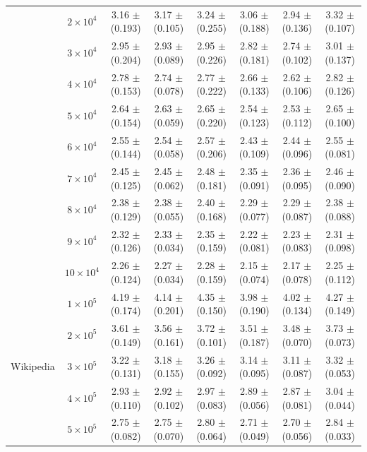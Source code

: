 \documentclass[10pt,journal,compsoc]{IEEEtran}
\newcommand{\Wikipedia}{{\sf Wikipedia}\xspace}
\begin{document}
\begin{table}
\begin{tabular}{c|c|c|c|c|c|c|c}
 & $2 \times 10^4 $ & 3.16 $\pm$ (0.193) & 3.17 $\pm$ (0.105) & 3.24 $\pm$ (0.255) & 3.06 $\pm$ (0.188) & 2.94 $\pm$ (0.136) & 3.32 $\pm$ (0.107)  \\
 & $3 \times 10^4 $ & 2.95 $\pm$ (0.204) & 2.93 $\pm$ (0.089) & 2.95 $\pm$ (0.226) & 2.82 $\pm$ (0.181) & 2.74 $\pm$ (0.102) & 3.01 $\pm$ (0.137)  \\
 & $4 \times 10^4 $ & 2.78 $\pm$ (0.153) & 2.74 $\pm$ (0.078) & 2.77 $\pm$ (0.222) & 2.66 $\pm$ (0.133) & 2.62 $\pm$ (0.106) & 2.82 $\pm$ (0.126) \\
 & $5 \times 10^4 $ & 2.64 $\pm$ (0.154) & 2.63 $\pm$ (0.059) & 2.65 $\pm$ (0.220) & 2.54 $\pm$ (0.123) & 2.53 $\pm$ (0.112) & 2.65 $\pm$ (0.100)  \\
 & $6 \times 10^4 $ & 2.55 $\pm$ (0.144) & 2.54 $\pm$ (0.058) & 2.57 $\pm$ (0.206) & 2.43 $\pm$ (0.109) & 2.44 $\pm$ (0.096) & 2.55 $\pm$ (0.081)  \\
 & $7 \times 10^4 $ & 2.45 $\pm$ (0.125) & 2.45 $\pm$ (0.062) & 2.48 $\pm$ (0.181) & 2.35 $\pm$ (0.091) & 2.36 $\pm$ (0.095) & 2.46 $\pm$ (0.090)  \\
 & $8 \times 10^4 $ & 2.38 $\pm$ (0.129) & 2.38 $\pm$ (0.055) & 2.40 $\pm$ (0.168) & 2.29 $\pm$ (0.077) & 2.29 $\pm$ (0.087) & 2.38 $\pm$ (0.088)  \\
 & $9 \times 10^4 $ & 2.32 $\pm$ (0.126) & 2.33 $\pm$ (0.034) & 2.35 $\pm$ (0.159) & 2.22 $\pm$ (0.081) & 2.23 $\pm$ (0.083) & 2.31 $\pm$ (0.098)  \\
 & $10 \times 10^4 $ & 2.26 $\pm$ (0.124) & 2.27 $\pm$ (0.034) & 2.28 $\pm$ (0.159) & 2.15 $\pm$ (0.074) & 2.17 $\pm$ (0.078) & 2.25 $\pm$ (0.112)  \\
\hline
\multirow{10}{*}{\Wikipedia}
 & $1 \times 10^5 $ & 4.19 $\pm$ (0.174) & 4.14 $\pm$ (0.201) & 4.35 $\pm$ (0.150) & 3.98 $\pm$ (0.190) & 4.02 $\pm$ (0.134) & 4.27 $\pm$ (0.149)  \\
 & $2 \times 10^5 $ & 3.61 $\pm$ (0.149) & 3.56 $\pm$ (0.161) & 3.72 $\pm$ (0.101) & 3.51 $\pm$ (0.187) & 3.48 $\pm$ (0.070) & 3.73 $\pm$ (0.073)  \\
 & $3 \times 10^5 $ & 3.22 $\pm$ (0.131) & 3.18 $\pm$ (0.155) & 3.26 $\pm$ (0.092) & 3.14 $\pm$ (0.095) & 3.11 $\pm$ (0.087) & 3.32 $\pm$ (0.053)  \\
 & $4 \times 10^5 $ & 2.93 $\pm$ (0.110) & 2.92 $\pm$ (0.102) & 2.97 $\pm$ (0.083) & 2.89 $\pm$ (0.056) & 2.87 $\pm$ (0.081) & 3.04 $\pm$ (0.044) \\
 & $5 \times 10^5 $ & 2.75 $\pm$ (0.082) & 2.75 $\pm$ (0.070) & 2.80 $\pm$ (0.064) & 2.71 $\pm$ (0.049) & 2.70 $\pm$ (0.056) & 2.84 $\pm$ (0.033)  \\

\end{tabular}
\end{table}
\end{document}

